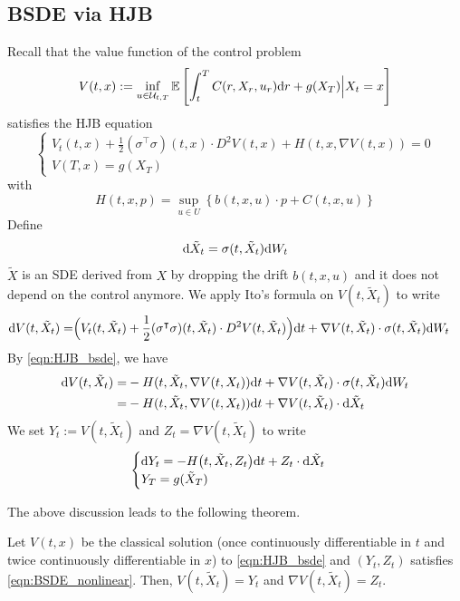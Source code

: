 \documentclass[11pt]{book}
\newcommand{\dd}{\text{\normalfont d}}
\newcommand{\dt}{\text{\normalfont d}t}
\newcommand{\dr}{\text{\normalfont d}r}
\newcommand{\dW}{\text{\normalfont d}W}
\begin{document}
\subsection{BSDE via HJB}
Recall that the value function of the control problem
\[
V(t,x):=\inf_{u\in\mathcal{U}_{t,T}}\mathbb{E}\left[\int_t^T C(r,X_r,u_r){{\dr}}+g(X_T)\Big|X_t=x\right]
\]
satisfies the HJB equation
\begin{equation}\label{eqn:HJB_bsde}
    \begin{cases}
        V_t(t,x)+\frac12(\sigma^{\intercal}\sigma)(t,x)\cdot D^2 V(t,x) + H(t,x,\nabla V(t,x)) = 0\\
    V(T,x) = g(X_T)
    \end{cases}
\end{equation}
with 
\[
H(t,x,p)=\sup_{u\in U}\left\{ b(t,x,u)\cdot p + C(t,x,u)\right\}
\]
Define 
\[
\dd\tilde{X}_t = \sigma(t,\tilde{X}_t)\dW_t
\]
$\tilde{X}$ is an SDE derived from $X$ by dropping the drift $b(t,x,u)$ and it does not depend on the control anymore. 
We apply Ito's formula on $V(t,\tilde{X}_t)$ to write
\[
\begin{split}
    \dd V(t,\tilde{X}_t)  = &\Big(V_t(t,\tilde{X}_t)+\frac12(\sigma^{\intercal}\sigma)(t,\tilde{X}_t)\cdot D^2 V(t,\tilde{X}_t)\Big){\dt} +  \nabla V(t,\tilde{X}_t)\cdot \sigma(t,\tilde{X}_t)\dW_t
\end{split}
\]
By \eqref{eqn:HJB_bsde}, we have 
\[
\begin{split}
    \dd V(t,\tilde{X}_t)  = & -H(t,\tilde{X}_t,\nabla V(t,X_t)){\dt} +  \nabla V(t,\tilde{X}_t)\cdot \sigma(t,\tilde{X}_t)\dW_t\\
    = & -H(t,\tilde{X}_t,\nabla V(t,X_t)){\dt} +  \nabla V(t,\tilde{X}_t)\cdot \dd\tilde{X}_t
\end{split}
\]
We set $Y_t:=V(t,\tilde{X}_t)$ and $Z_t=\nabla V(t,\tilde{X}_t)$ to write
\begin{equation}
\label{eqn:BSDE_nonlinear}
    \begin{cases}
        \dd Y_t = -H\big(t,\tilde{X}_t,Z_t\big)\dt + Z_t\cdot\dd\tilde{X}_t\\
        Y_T=g(\tilde{X}_T)
    \end{cases}
\end{equation}

The above discussion leads to the following theorem.
\begin{thm}
\label{thm:BSDE}
    Let $V(t,x)$ be the classical solution (once continuously differentiable in $t$ and twice continuously differentiable in $x$) to \eqref{eqn:HJB_bsde} and $(Y_t,Z_t)$ satisfies \eqref{eqn:BSDE_nonlinear}. Then,  $V(t,\tilde{X}_t) = Y_t$ and $\nabla V(t,\tilde{X}_t) = Z_t$.
\end{thm}
\end{document}
